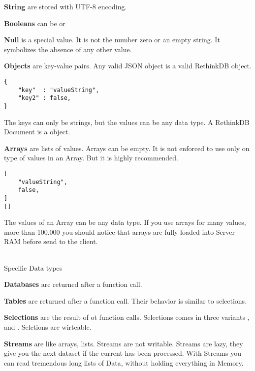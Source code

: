 \textbf{String} are stored with UTF-8 encoding.

\textbf{Booleans} can be  or 

\textbf{Null} is a special value.
It is not the number zero or an empty string.
It symbolizes the absence of any other value.

\textbf{Objects} are key-value pairs.
Any valid JSON object is a valid RethinkDB object.
\begin{lstlisting}[frame=single, caption=example Object, label=refdoc]
{
	"key"  : "valueString",
	"key2" : false,
}
\end{lstlisting}
The keys can only be strings, but the values can be any data type.
A RethinkDB Document is a object.

\textbf{Arrays} are lists of values.
Arrays can be empty.
It is not enforced to use only on type of values in an Array.
But it is highly recommended.
\begin{lstlisting}[frame=single, caption=example Arrays, label=refdoc]
[
	"valueString",
	false,
]
[]
\end{lstlisting}
The values of an Array can be any data type.
If you use arrays for many values, more than 100.000 you should notice that arrays are fully loaded into Server RAM before send to the client.

\\
Specific Data types

\textbf{Databases} are returned after a  function call.

\textbf{Tables} are returned after a  function call.
Their behavior is similar to selections.

\textbf{Selections} are the result of  ot  function calls.
Selections comes in three variants ,  and .
Selctions are wirteable.

\textbf{Streams} are like arrays, lists.
Streams are not writable.
Streams are lazy, they give you the next dataset if the current has been processed.
With Streams you can read tremendous long lists of Data, without holding everything in Memory.
